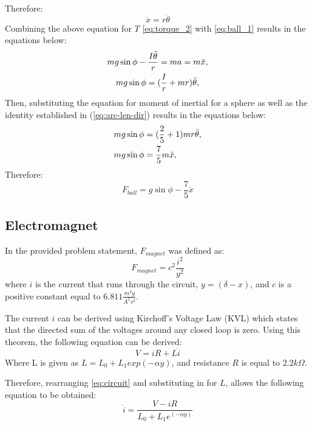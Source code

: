 \documentclass[a4paper,10pt,reqno]{amsart}
\numberwithin{equation}{section}
\begin{document}
Therefore:
\begin{equation}
\label{eq:arc-len-dir}
    \ddot x=r\ddot \theta
\end{equation}
Combining the above equation for $T$ \eqref{eq:torque_2} with \eqref{eq:ball_1} results in the equations below:
\begin{gather*}
    \notag mg\sin{\phi}-\frac{I\ddot \theta}{r}=ma=m\ddot x, \\
    \notag mg\sin{\phi}=(\frac{I}{r}+mr)\ddot \theta, \\
\end{gather*}  
Then, substituting the equation for moment of inertial for a sphere as well as the identity established in (\ref{eq:arc-len-dir}) results in the equations below:
\begin{align*}
    \notag mg\sin{\phi}&=(\frac{2}{5}+1)mr\ddot \theta, \\
    \notag mg\sin{\phi}&=\frac{7}{5}m\ddot x, \\
\end{align*}
Therefore:
\begin{equation}
\label{eq:ball_2}
      F_{ball}=g\sin{\phi}-\frac{7}{5}\ddot x
\end{equation}

\subsection{Electromagnet}
In the provided problem statement, $F_{magnet}$ was defined as:
\begin{equation}
\label{eq:mag}
    F_{magnet}=c^2\frac{i^2}{y^2}
\end{equation}
where $i$ is the current that runs through the circuit, $y=(\delta-x)$, and $c$ is a positive constant equal to $6.811 \frac{m^3g}{A^2s^2}$. 

The current $i$ can be derived using Kirchoff's Voltage Law (KVL) which states that the directed sum of the voltages around any
closed loop is zero.
Using this theorem, the following equation can be derived:
\begin{equation}
\label{eq:circuit}
    V= iR + L\dot{i}
\end{equation}
Where L is given as $L = L_0 + L_1exp(-\alpha y)$, and resistance $R$ is equal to $2.2 k \Omega$.

Therefore, rearranging \eqref{eq:circuit} and substituting in for $L$, allows the following equation to be obtained:
\begin{equation}
\label{eq:I_dot}
    \dot{i} = \frac{V-iR}{L_0 + L_1e^{(-\alpha y)}}
\end{equation}
\end{document}
